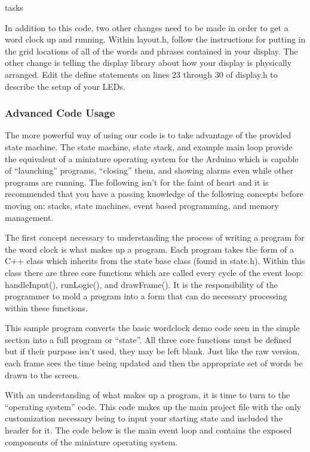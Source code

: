 tasks\documentclass[onecolumn, draftclsnofoot,10pt, compsoc]{IEEEtran}
\begin{document}
In addition to this code, two other changes need to be made in order to get a word clock up and running.
Within layout.h, follow the instructions for putting in the grid locations of all of the words and phrases contained in your display.
The other change is telling the display library about how your display is physically arranged.
Edit the define statements on lines 23 through 30 of display.h to describe the setup of your LEDs.

\subsubsection{Advanced Code Usage}
The more powerful way of using our code is to take advantage of the provided state machine.
The state machine, state stack, and example main loop provide the equivalent of a miniature operating system for the Arduino which is capable of ``launching'' programs, ``closing'' them, and showing alarms even while other programs are running.
The following isn’t for the faint of heart and it is recommended that you have a passing knowledge of the following concepts before moving on: stacks, state machines, event based programming, and memory management.

The first concept necessary to understanding the process of writing a program for the word clock is what makes up a program.
Each program takes the form of a C++ class which inherits from the state base class (found in state.h).
Within this class there are three core functions which are called every cycle of the event loop: handleInput(), runLogic(), and drawFrame().
It is the responsibility of the programmer to mold a program into a form that can do necessary processing within these functions.



This sample program converts the basic wordclock demo code seen in the simple section into a full program or ``state''.
All three core functions must be defined but if their purpose isn't used, they may be left blank.
Just like the raw version, each frame sees the time being updated and then the appropriate set of words be drawn to the screen.

With an understanding of what makes up a program, it is time to turn to the ``operating system'' code.
This code makes up the main project file with the only customization necessary being to input your starting state and included the header for it.
The code below is the main event loop and contains the exposed components of the miniature operating system.
\end{document}
